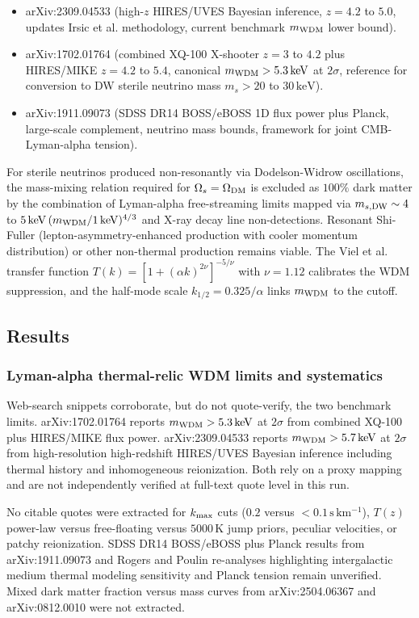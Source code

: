 \documentclass[11pt,a4paper]{article}
\begin{document}
\begin{itemize}
  \item arXiv:2309.04533 (high-$z$ HIRES/UVES Bayesian inference, $z = 4.2$ to $5.0$, updates Irsic et al. methodology, current benchmark $m_{\rm WDM}$ lower bound).
  \item arXiv:1702.01764 (combined XQ-100 X-shooter $z = 3$ to $4.2$ plus HIRES/MIKE $z = 4.2$ to $5.4$, canonical $m_{\rm WDM} > 5.3\,\mathrm{keV}$ at $2\sigma$, reference for conversion to DW sterile neutrino mass $m_s > 20$ to $30\,\mathrm{keV}$).
  \item arXiv:1911.09073 (SDSS DR14 BOSS/eBOSS 1D flux power plus Planck, large-scale complement, neutrino mass bounds, framework for joint CMB-Lyman-alpha tension).
\end{itemize}
For sterile neutrinos produced non-resonantly via Dodelson-Widrow oscillations, the mass-mixing relation required for $\Omega_s = \Omega_{\rm DM}$ is excluded as $100\%$ dark matter by the combination of Lyman-alpha free-streaming limits mapped via $m_{s,{\rm DW}} \sim 4$ to $5\,\mathrm{keV}\,(m_{\rm WDM}/1\,\mathrm{keV})^{4/3}$ and X-ray decay line non-detections. Resonant Shi-Fuller (lepton-asymmetry-enhanced production with cooler momentum distribution) or other non-thermal production remains viable. The Viel et al. transfer function $T(k) = [1+(\alpha k)^{2\nu}]^{-5/\nu}$ with $\nu = 1.12$ calibrates the WDM suppression, and the half-mode scale $k_{1/2} = 0.325/\alpha$ links $m_{\rm WDM}$ to the cutoff.

\subsection{Results}
\subsubsection{Lyman-alpha thermal-relic WDM limits and systematics}
Web-search snippets corroborate, but do not quote-verify, the two benchmark limits. arXiv:1702.01764 reports $m_{\rm WDM} > 5.3\,\mathrm{keV}$ at $2\sigma$ from combined XQ-100 plus HIRES/MIKE flux power. arXiv:2309.04533 reports $m_{\rm WDM} > 5.7\,\mathrm{keV}$ at $2\sigma$ from high-resolution high-redshift HIRES/UVES Bayesian inference including thermal history and inhomogeneous reionization. Both rely on a proxy mapping and are not independently verified at full-text quote level in this run.

No citable quotes were extracted for $k_{\rm max}$ cuts ($0.2$ versus $<0.1\,\mathrm{s\,km^{-1}}$), $T(z)$ power-law versus free-floating versus $5000\,\mathrm{K}$ jump priors, peculiar velocities, or patchy reionization. SDSS DR14 BOSS/eBOSS plus Planck results from arXiv:1911.09073 and Rogers and Poulin re-analyses highlighting intergalactic medium thermal modeling sensitivity and Planck tension remain unverified. Mixed dark matter fraction versus mass curves from arXiv:2504.06367 and arXiv:0812.0010 were not extracted.
\end{document}
